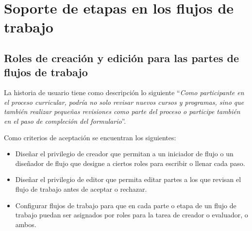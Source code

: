 \section{Soporte de etapas en los flujos de trabajo}
\begin{table}[H]
\centering
\caption{Historias de usuario para soporte de etapas en los flujos de trabajo}
\label{epic:8}
\end{table}

\subsection{Roles de creación y edición para las partes de flujos de trabajo}
La historia de usuario tiene como descripción lo siguiente \enquote{\textit{Como participante en el proceso curricular, podría no solo revisar nuevos cursos y programas, sino que también realizar pequeñas revisiones como parte del proceso o participe también en el paso de compleción del formulario}}.

Como criterios de aceptación se encuentran los siguientes:
\begin{itemize}
	\item Diseñar el privilegio de creador que permitan a un iniciador de flujo o un diseñador de flujo que designe a ciertos roles para escribir o llenar cada paso.
	\item Diseñar el privilegio de editor que permita editar partes a los que revisan el flujo de trabajo antes de aceptar o rechazar.
	\item Configurar flujos de trabajo para que en cada parte o etapa de un flujo de trabajo puedan ser asignados por roles para la tarea de creador o evaluador, o ambos.
\end{itemize}

